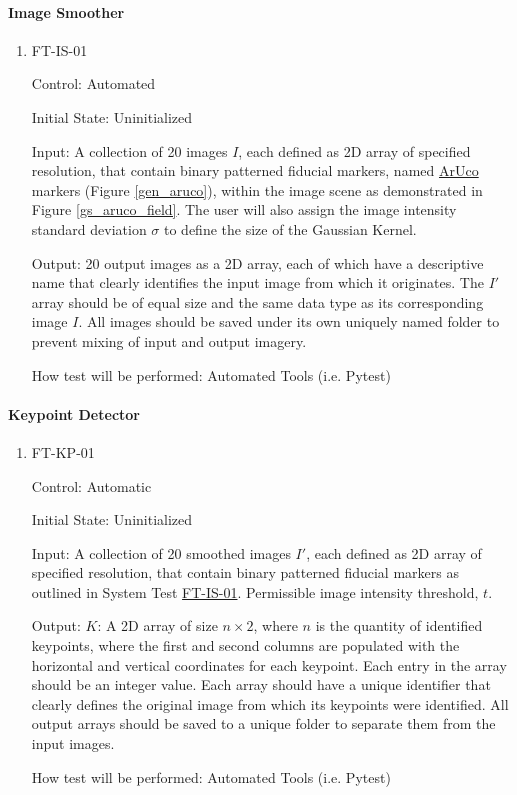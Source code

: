 \documentclass[12pt, titlepage]{article}
\begin{document}
\paragraph{Image Smoother}
\begin{enumerate}
\item \hypertarget{FT-IS-01}{FT-IS-01}
Control: Automated		

Initial State: Uninitialized

Input: A collection of 20 images $I$, each defined as 2D array of specified resolution, that contain 
binary patterned fiducial markers, named 
\href{https://docs.opencv.org/4.x/d5/dae/tutorial_aruco_detection.html}
{ArUco} markers (Figure \ref{gen_aruco}), within the image scene as demonstrated 
in Figure \ref{gs_aruco_field}. The user will also assign the image intensity standard deviation $\sigma$ to define the 
size of the Gaussian Kernel.

Output: 20 output images as a 2D array, each of which have a descriptive name that clearly identifies the 
input image from which it originates. The $I'$ array should be of equal size and the same data type as its 
corresponding image $I$. All images should be saved under its own uniquely named folder to prevent mixing 
of input and output imagery.

How test will be performed: Automated Tools (i.e. Pytest)

\end{enumerate}


\paragraph{Keypoint Detector}
\begin{enumerate}
\item \hypertarget{FT-KP-01}{FT-KP-01\\}
Control: Automatic	

Initial State: Uninitialized			

Input: A collection of 20 smoothed images $I'$, each defined as 2D array of specified resolution, that contain 
binary patterned fiducial markers as outlined in System Test \hyperlink{FT-IS-01}{FT-IS-01}. 
Permissible image intensity threshold, $t$.

Output: $K$: A 2D array of size $n \times 2$, where $n$ is the quantity of identified keypoints, 
where the first and second columns are populated with the horizontal and vertical coordinates for each 
keypoint. Each entry in the array should be an integer value. Each array should have a unique identifier that 
clearly defines the original image from which its keypoints were identified. All output arrays should be saved 
to a unique folder to separate them from the input images.

How test will be performed: Automated Tools (i.e. Pytest)
\end{enumerate}
\end{document}
